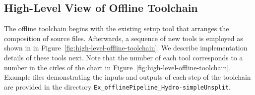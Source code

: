 \documentclass{article}
\begin{document}
\subsection{High-Level View of Offline Toolchain}
\label{sec:high-level-offline-toolchain}

The offline toolchain begins with the existing setup tool that arranges the
composition of source files.  Afterwards, a sequence of new tools is employed
as shown in in Figure~\ref{fig:high-level-offline-toolchain}.  We describe
implementation details of these tools next.  Note that the number of each tool
corresponds to a number in the cirles of the chart in
Figure~\ref{fig:high-level-offline-toolchain}.
Example files demonstrating the inputs and outputs of each step of the toolchain are provided
in the directory \texttt{Ex\_offlinePipeline\_Hydro-simpleUnsplit}.
\end{document}
